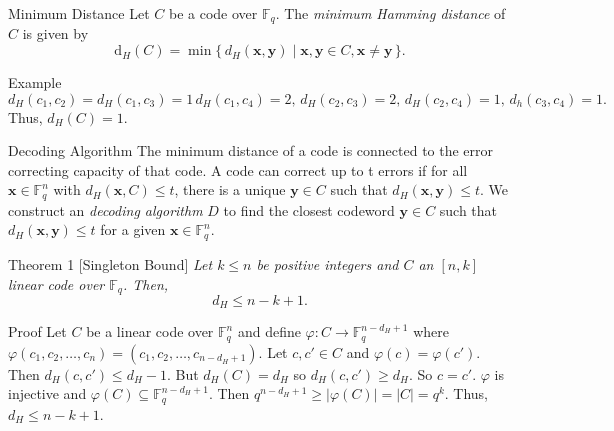 \begin{frame}[allowframebreaks]
\framebreak

        \begin{block}{Minimum Distance}
        Let $C$ be a code over $\mathbb F_q$. The \textit{minimum Hamming distance} of $C$ is given by
        \[
        \mathrm{d}_H(C) = 
        \min\{\,d_H(\textbf{x}, \textbf{y}) \mid 
        \textbf{x}, \textbf{y} \in C, \textbf{x} \neq \textbf{y} \,\}.
        \]
        \end{block}


        \begin{exampleblock}{Example}
            $d_H(c_1, c_2)=d_H(c_1, c_3)=1\,d_H(c_1, c_4)=2,\,d_H(c_2, c_3)=2,\,d_H(c_2, c_4)=1,\,d_h(c_3, c_4)=1.$\\
            Thus, $d_H(C)=1$.
        \end{exampleblock}
        
\framebreak

    \begin{block}{Decoding Algorithm}
        The minimum distance of a code is connected to the error correcting capacity of that code. A code can correct up to t errors if for all 
        $\mathbf{x} \in \mathbb{F}_q^n$ with $d_H(\mathbf{x}, C) \leq t$, there is a unique $\mathbf{y} \in C$ such that $d_H(\mathbf{x}, \mathbf{y}) \leq t$.
        We construct an \textit{decoding algorithm} $D$ to find the closest codeword $\mathbf{y} \in C$ such that $d_H(\mathbf{x}, \mathbf{y}) \leq t$ for a given 
        $\mathbf{x} \in \mathbb{F}_q^n$.\\[0.4cm]
    \end{block}
    
\framebreak

    \begin{block}{Theorem 1}
        [Singleton Bound]
        \textit{Let $k \leq n$ be positive integers and $C$ an $[n, k]$ linear code over $\mathbb{F}_q$. Then,}
        \[
        d_H \leq n - k + 1.
        \]        
    \end{block}

    \begin{block}{Proof}
        Let $C$ be a linear code over $\mathbb{F}_q^n$ and define $\varphi: C \xrightarrow{}\mathbb{F}_q^{n-d_H+1}$ where 
        $\varphi(c_1, c_2, \dots,c_n) = (c_1,c_2,\dots,c_{n-d_H+1})$. 
        Let $c,c' \in C$ and $\varphi(c)=\varphi(c')$.
        Then $d_H(c, c') \leq d_H-1$.
        But $d_H(C)=d_H$ so $d_H(c, c') \geq d_H$. So $c = c'$. 
        $\varphi$ is injective and $\varphi(C) \subseteq \mathbb{F}_q^{n-d_H+1}$. Then $q^{n-d_H+1}\geq|\varphi(C)|=|C|=q^k$.
        Thus, $d_H\leq n-k+1 $.
    \end{block}


\end{frame}
